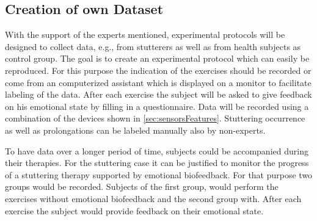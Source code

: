 \subsection{Creation of own Dataset}
\label{subsec:newData}
With the support of the experts mentioned, experimental protocols will be designed to collect data, e.g., from stutterers as well as from health subjects as control group. The goal is to create an experimental protocol which can easily be reproduced. For this purpose the indication of the exercises should be recorded or come from an computerized assistant which is displayed on a monitor to facilitate labeling of the data. After each exercise the subject will be asked to give feedback on his emotional state by filling in a questionnaire. Data will be recorded using a combination of the devices shown in \ref{sec:sensorsFeatures}. Stuttering occurrence as well as prolongations can be labeled manually also by non-experts.

To have data over a longer period of time, subjects could be accompanied during their therapies. For the stuttering case it can be justified to monitor the progress of a stuttering therapy supported by emotional biofeedback. For that purpose two groups would be recorded. Subjects of the first group, would perform the exercises without emotional biofeedback and the second group with. After each exercise the subject would provide feedback on their emotional state. 


